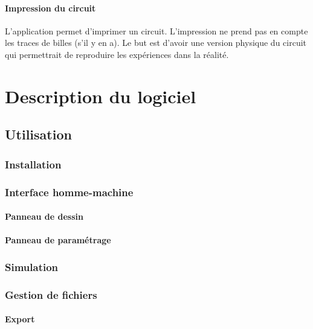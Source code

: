 \documentclass{report}
\begin{document}
\subsubsection{Impression du circuit}

L’application permet d’imprimer un circuit. L’impression ne prend pas en compte les traces de billes (s’il y en a). Le but est d’avoir une version physique du circuit qui permettrait de reproduire les expériences dans la réalité.

\chapter{Description du logiciel}

\section{Utilisation}

\subsection{Installation}

\subsection{Interface homme-machine}

\subsubsection{Panneau de dessin}

\subsubsection{Panneau de paramétrage}

\subsection{Simulation}

\subsection{Gestion de fichiers}

\subsubsection{Export}
\end{document}
